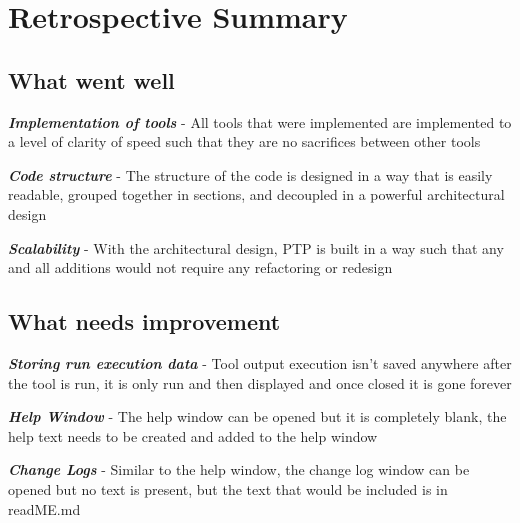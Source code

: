 \documentclass{article}
\begin{document}
\newpage
\section{Retrospective Summary}
\subsection{What went well}
\begin{center}
    \textbf{\textit{Implementation of tools}} - All tools that were implemented are implemented to a level of clarity of speed such that they are no sacrifices between other tools
\end{center}
\begin{center}
    \textbf{\textit{Code structure}} - The structure of the code is designed in a way that is easily readable, grouped together in sections, and decoupled in a powerful architectural design
\end{center}
\begin{center}
    \textbf{\textit{Scalability}} - With the architectural design, PTP is built in a way such that any and all additions would not require any refactoring or redesign
\end{center}

\subsection{What needs improvement}
\begin{center}
    \textbf{\textit{Storing run execution data}} - Tool output execution isn't saved anywhere after the tool is run, it is only run and then displayed and once closed it is gone forever
\end{center}
\begin{center}
    \textbf{\textit{Help Window}} - The help window can be opened but it is completely blank, the help text needs to be created and added to the help window
\end{center}
\begin{center}
    \textbf{\textit{Change Logs}} - Similar to the help window, the change log window can be opened but no text is present, but the text that would be included is in readME.md
\end{center}
\end{document}
